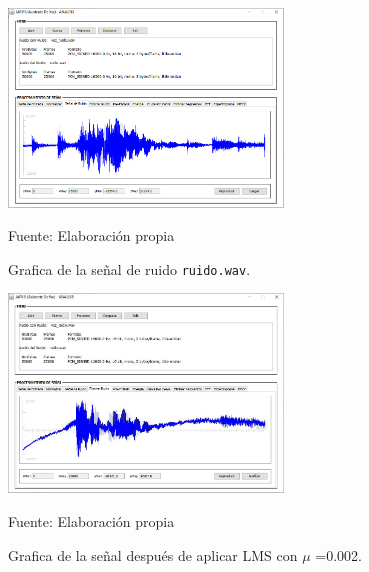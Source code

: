 \vskip -1.0cm

\begin{figure}[H]
\begin{center}
\includegraphics[width=0.65\textwidth]{Imagenes/Cap3/image078}
\end{center}
\begin{center}
\vskip -0.5cm
\caption{\small{Grafica de la señal de ruido \texttt{ruido.wav}.}}
\label{fig:figura3.78}
{\small{Fuente: Elaboración propia}}
\end{center}
\end{figure}

\begin{figure}[H]
\begin{center}
\includegraphics[width=0.65\textwidth]{Imagenes/Cap3/image080}
\end{center}
\begin{center}
\vskip -0.5cm
\caption{\small{Grafica de la señal después de aplicar LMS con $\mu$ =0.002.}}
\label{fig:figura3.80}
{\small{Fuente: Elaboración propia}}
\end{center}
\end{figure}

\vskip -1.0cm

